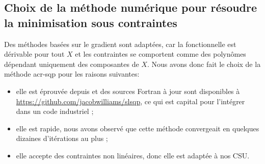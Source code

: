 \subsection{Choix de la méthode numérique pour résoudre la minimisation sous contraintes}

  Des méthodes basées sur le gradient sont adaptées, car la fonctionnelle est dérivable pour tout \(X\) et les contraintes se comportent comme des polynômes dépendant uniquement des composantes de \(X\). Nous avons donc fait le choix de la méthode \gls{acr-sqp} pour les raisons suivantes:
 
  \begin{itemize}
    \item elle est éprouvée depuis \cite{kraft_software_1988} et des sources Fortran à jour sont disponibles à \url{https://github.com/jacobwilliams/slsqp}, ce qui est capital pour l'intégrer dans un code industriel ;
    \item elle est rapide, nous avons observé que cette méthode convergeait en quelques dizaines d'itérations au plus ;
    \item elle accepte des contraintes non linéaires, donc elle est adaptée à nos CSU.
  \end{itemize}


